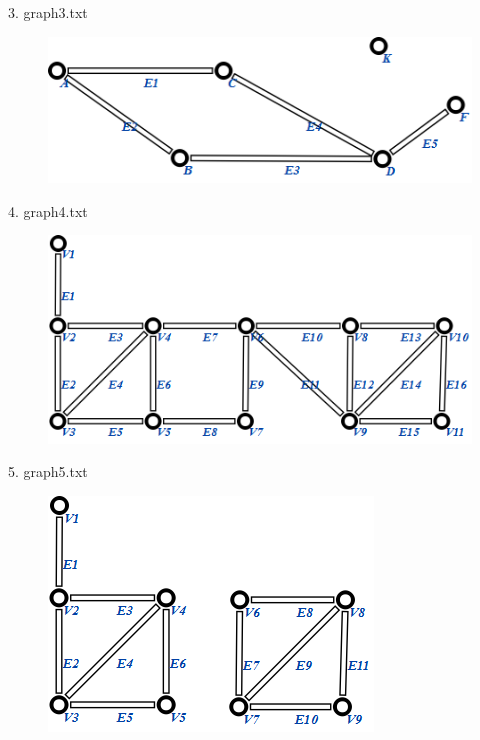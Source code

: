 3.	graph3.txt

\begin{figure}[h!]
  \centering
  \includegraphics{images/1/test/3}
\end{figure}
 
4.	graph4.txt

\begin{figure}[h!]
  \centering
  \includegraphics{images/1/test/4}
\end{figure}
 
5.	graph5.txt

\begin{figure}[h!]
  \centering
  \includegraphics{images/1/test/5}
\end{figure}

